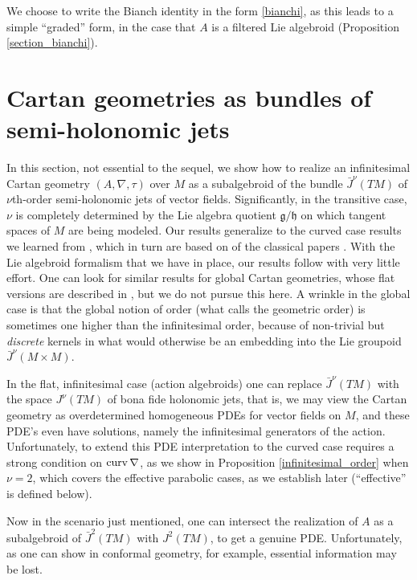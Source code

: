 \documentclass[leqno,12pt]{amsart} %
\newcommand\refreshpage{\newpage}
\newcommand\refreshpage{}
\begin{document}
\begin{remark}
  We choose to write the Bianch identity in the form \eqref{bianchi}, as this leads to a
  simple ``graded'' form, in the case that $A$ is a filtered Lie algebroid (Proposition
  \ref{section_bianchi}).
\end{remark}

\refreshpage
\section{Cartan geometries as bundles of semi-holonomic jets}\label{jets}
In this section, not essential to the sequel, we show how to realize an infinitesimal
Cartan geometry $(A, \nabla, \tau)$ over $M$ as a subalgebroid of the bundle
$\bar J^\nu(TM)$ of $\nu$th-order semi-holonomic jets of vector fields. Significantly, in
the transitive case, $\nu$ is completely determined by the Lie algebra quotient
${\mathfrak g} / {\mathfrak h} $ on which tangent spaces of $M$ are being modeled. Our
results generalize to the curved case results we learned from \cite{Abadoglu_etal_08},
which in turn are based on of the classical papers
\cite{Guillemin_Sternberg_64,Singer_Sternberg_65}. With the Lie algebroid formalism that
we have in place, our results follow with very little effort. One can look for similar
results for global Cartan geometries, whose flat versions are described in
\cite{Abadoglu_etal_08}, but we do not pursue this here. A wrinkle in the global case is
that the global notion of order (what \cite{Abadoglu_etal_08} calls the {\df geometric
  order}) is sometimes one higher than the infinitesimal order, because of non-trivial but
{\em discrete} kernels in what would otherwise be an embedding into the Lie groupoid
$\bar J^\nu(M \times M)$.

In the flat, infinitesimal case (action algebroids) one can replace $\bar J^\nu(TM)$ with
the space $J^\nu(TM)$ of bona fide holonomic jets, that is, we may view the Cartan
geometry as overdetermined homogeneous PDEs for vector fields on $M$, and these PDE's even
have solutions, namely the infinitesimal generators of the action.  Unfortunately, to
extend this PDE interpretation to the curved case requires a strong condition on
$\operatorname{curv}\nabla $, as we show in Proposition \ref{infinitesimal_order} when $\nu=2$,
which covers the effective parabolic cases, as we establish later (``effective'' is
defined below).

Now in the scenario just mentioned, one can intersect the realization of $A$ as a
subalgebroid of $\bar J^2(TM)$ with $J^2(TM)$, to get a genuine PDE. Unfortunately, as one
can show in conformal geometry, for example, essential information may be lost.
\end{document}
